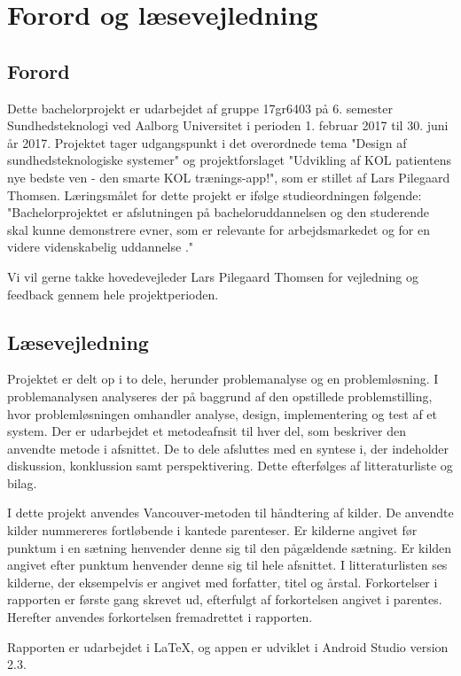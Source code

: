 \chapter*{Forord og læsevejledning}

\section*{Forord}
Dette bachelorprojekt er udarbejdet af gruppe 17gr6403 på 6. semester Sundhedsteknologi ved Aalborg Universitet i perioden 1. februar 2017 til 30. juni år 2017. Projektet tager udgangspunkt i det overordnede tema "Design af sundhedsteknologiske systemer" og projektforslaget "Udvikling af KOL patientens nye bedste ven - den smarte KOL trænings-app!", som er stillet af Lars Pilegaard Thomsen. 
Læringsmålet for dette projekt er ifølge studieordningen følgende: "Bachelorprojektet er afslutningen på bacheloruddannelsen og den studerende skal kunne demonstrere evner, som er relevante for arbejdsmarkedet og for en videre videnskabelig uddannelse \cite{Studieordning2014}."

Vi vil gerne takke hovedevejleder Lars Pilegaard Thomsen for vejledning og feedback gennem hele projektperioden.

\section*{Læsevejledning}
Projektet er delt op i to dele, herunder problemanalyse og en problemløsning. I problemanalysen analyseres der på baggrund af den opstillede problemstilling, hvor problemløsningen omhandler analyse, design, implementering og test af et system. Der er udarbejdet et metodeafnsit til hver del, som beskriver den anvendte metode i afsnittet. De to dele afsluttes med en syntese i, der indeholder diskussion, konklussion samt perspektivering. Dette efterfølges af litteraturliste og bilag. 

I dette projekt anvendes Vancouver-metoden til håndtering af kilder. De anvendte kilder nummereres fortløbende i kantede parenteser. Er kilderne angivet før punktum i en sætning henvender denne sig til den pågældende sætning. Er kilden angivet efter punktum henvender denne sig til hele afsnittet. I litteraturlisten ses kilderne, der eksempelvis er angivet med forfatter, titel og årstal. Forkortelser i rapporten er første gang skrevet ud, efterfulgt af forkortelsen angivet i parentes. Herefter anvendes forkortelsen fremadrettet i rapporten.

Rapporten er udarbejdet i \LaTeX, og appen er udviklet i Android Studio version 2.3.